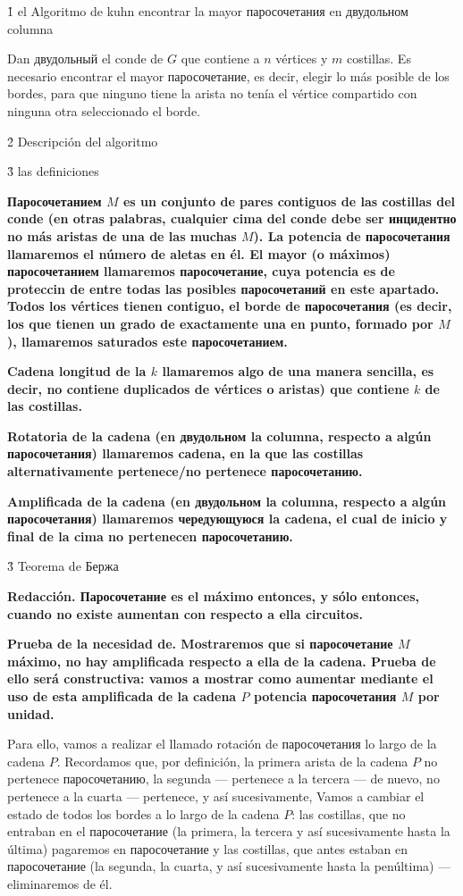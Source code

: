 \h1{ el Algoritmo de kuhn encontrar la mayor паросочетания en двудольном columna }

Dan двудольный el conde de $G$ que contiene a $n$ vértices y $m$ costillas. Es necesario encontrar el mayor паросочетание, es decir, elegir lo más posible de los bordes, para que ninguno tiene la arista no tenía el vértice compartido con ninguna otra seleccionado el borde.


\h2{ Descripción del algoritmo }


\h3{ las definiciones }

\bf{Паросочетанием} $M$ es un conjunto de pares contiguos de las costillas del conde (en otras palabras, cualquier cima del conde debe ser инцидентно no más aristas de una de las muchas $M$). La potencia de паросочетания llamaremos el número de aletas en él. El mayor (o máximos) паросочетанием llamaremos паросочетание, cuya potencia es de proteccin de entre todas las posibles паросочетаний en este apartado. Todos los vértices tienen contiguo, el borde de паросочетания (es decir, los que tienen un grado de exactamente una en punto, formado por $M$), llamaremos saturados este паросочетанием.

\bf{Cadena} longitud de la $k$ llamaremos algo de una manera sencilla, es decir, no contiene duplicados de vértices o aristas) que contiene $k$ de las costillas.

\bf{Rotatoria de la cadena} (en двудольном la columna, respecto a algún паросочетания) llamaremos cadena, en la que las costillas alternativamente pertenece/no pertenece паросочетанию.

\bf{Amplificada de la cadena} (en двудольном la columna, respecto a algún паросочетания) llamaremos чередующуюся la cadena, el cual de inicio y final de la cima no pertenecen паросочетанию.


\h3{ Teorema de Бержа }

\bf{Redacción}. Паросочетание es el máximo entonces, y sólo entonces, cuando no existe aumentan con respecto a ella circuitos.

\bf{Prueba de la necesidad de}. Mostraremos que si паросочетание $M$ máximo, no hay amplificada respecto a ella de la cadena. Prueba de ello será constructiva: vamos a mostrar como aumentar mediante el uso de esta amplificada de la cadena $P$ potencia паросочетания $M$ por unidad.

Para ello, vamos a realizar el llamado rotación de паросочетания lo largo de la cadena $P$. Recordamos que, por definición, la primera arista de la cadena $P$ no pertenece паросочетанию, la segunda --- pertenece a la tercera --- de nuevo, no pertenece a la cuarta --- pertenece, y así sucesivamente, Vamos a cambiar el estado de todos los bordes a lo largo de la cadena $P$: las costillas, que no entraban en el паросочетание (la primera, la tercera y así sucesivamente hasta la última) pagaremos en паросочетание y las costillas, que antes estaban en паросочетание (la segunda, la cuarta, y así sucesivamente hasta la penúltima) --- eliminaremos de él.

